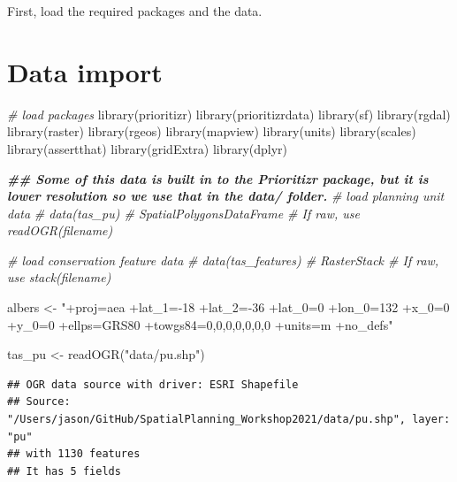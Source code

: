 \documentclass[
  12pt,
]{book}
\newenvironment{Shaded}{\begin{snugshade}}{\end{snugshade}}
\newcommand{\CommentTok}[1]{\textcolor[rgb]{0.56,0.35,0.01}{\textit{#1}}}
\newcommand{\DocumentationTok}[1]{\textcolor[rgb]{0.56,0.35,0.01}{\textbf{\textit{#1}}}}
\newcommand{\FunctionTok}[1]{\textcolor[rgb]{0.00,0.00,0.00}{#1}}
\newcommand{\NormalTok}[1]{#1}
\newcommand{\OtherTok}[1]{\textcolor[rgb]{0.56,0.35,0.01}{#1}}
\newcommand{\StringTok}[1]{\textcolor[rgb]{0.31,0.60,0.02}{#1}}
\begin{document}
First, load the required packages and the data.

\hypertarget{data-import}{%
\section{Data import}\label{data-import}}

\begin{Shaded}
\begin{Highlighting}[]
\CommentTok{\# load packages}
\FunctionTok{library}\NormalTok{(prioritizr)}
\FunctionTok{library}\NormalTok{(prioritizrdata)}
\FunctionTok{library}\NormalTok{(sf)}
\FunctionTok{library}\NormalTok{(rgdal)}
\FunctionTok{library}\NormalTok{(raster)}
\FunctionTok{library}\NormalTok{(rgeos)}
\FunctionTok{library}\NormalTok{(mapview)}
\FunctionTok{library}\NormalTok{(units)}
\FunctionTok{library}\NormalTok{(scales)}
\FunctionTok{library}\NormalTok{(assertthat)}
\FunctionTok{library}\NormalTok{(gridExtra)}
\FunctionTok{library}\NormalTok{(dplyr)}
\end{Highlighting}
\end{Shaded}

\begin{Shaded}
\begin{Highlighting}[]
\DocumentationTok{\#\# Some of this data is built in to the Prioritizr package, but it is lower resolution so we use that in the data/ folder.}
\CommentTok{\# load planning unit data}
\CommentTok{\# data(tas\_pu) \# SpatialPolygonsDataFrame \# If raw, use readOGR(filename)}

\CommentTok{\# load conservation feature data}
\CommentTok{\# data(tas\_features) \# RasterStack \# If raw, use stack(filename)}

\NormalTok{albers }\OtherTok{\textless{}{-}} \StringTok{"+proj=aea +lat\_1={-}18 +lat\_2={-}36 +lat\_0=0 +lon\_0=132 +x\_0=0 +y\_0=0 +ellps=GRS80 +towgs84=0,0,0,0,0,0,0 +units=m +no\_defs"}

\NormalTok{tas\_pu }\OtherTok{\textless{}{-}} \FunctionTok{readOGR}\NormalTok{(}\StringTok{"data/pu.shp"}\NormalTok{)}
\end{Highlighting}
\end{Shaded}

\begin{verbatim}
## OGR data source with driver: ESRI Shapefile 
## Source: "/Users/jason/GitHub/SpatialPlanning_Workshop2021/data/pu.shp", layer: "pu"
## with 1130 features
## It has 5 fields
\end{verbatim}
\end{document}
